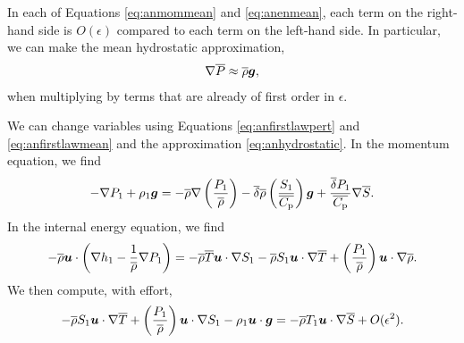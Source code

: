 \documentclass[12pt]{article}
\begin{document}
  In each of Equations \eqref{eq:anmommean} and \eqref{eq:anenmean}, each term on the right-hand side is $O(\epsilon)$ compared to each term on the left-hand side. In particular, we can make the mean hydrostatic approximation, 
\begin{align}\label{eq:anhydrostatic}
	\nabla\overline{P}\approx \overline{\rho}\bm{g},
\end{align}
when multiplying by terms that are already of first order in $\epsilon$. 

We can change variables using Equations \eqref{eq:anfirstlawpert} and \eqref{eq:anfirstlawmean} and the approximation \eqref{eq:anhydrostatic}. In the momentum equation, we find
\begin{align}\label{eq:anrhsmom}
	-\nabla P_1 + \rho_1\bm{g} = -\overline{\rho}\nabla\left(\frac{P_1}{\overline{\rho}}\right) - \overline{\delta} \overline{\rho} \left(\frac{S_1}{\overline{C_{\rm{p}}}}\right) \bm{g} + \frac{\overline{\delta}P_1}{\overline{C_{\rm{p}}}}\nabla\overline{S}.
\end{align}
In the internal energy equation, we find
\begin{align}\label{eq:anrhsen}
	-\overline{\rho}\bm{u}\cdot\left(\nabla h_1-\frac{1}{\overline{\rho}}\nabla P_1\right) = -\overline{\rho}\overline{T}\bm{u}\cdot\nabla S_1 - \overline{\rho} S_1\bm{u}\cdot\nabla\overline{T} + \left(\frac{P_1}{\overline{\rho}}\right)\bm{u}\cdot\nabla \overline{\rho}.
\end{align}
We then compute, with effort,
\begin{align}\label{eq:anrhsen2}
	- \overline{\rho} S_1\bm{u}\cdot\nabla\overline{T} + \left(\frac{P_1}{\overline{\rho}}\right)\bm{u}\cdot\nabla S_1 -\rho_1\bm{u}\cdot\bm{g} = -\overline{\rho} T_1\bm{u}\cdot\nabla\overline{S} + O(\epsilon^2).
\end{align}
\end{document}
